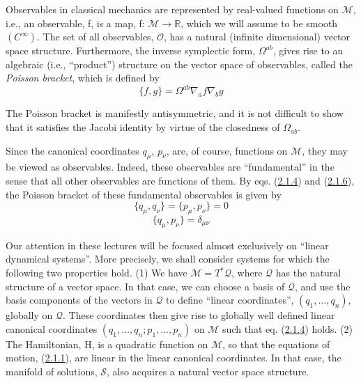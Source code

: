 \documentclass[11pt,a4paper]{article}
\begin{document}
Observables in classical mechanics are represented by real-valued functions on \(\mathcal{M}\), i.e., an observable, f, is a map, f: \(\mathcal{M} \to \mathbb{R}\), which we will assume to be smooth \((C^{\scriptscriptstyle\infty})\). The set of all observables, \(\mathcal{O}\), has a natural (infinite dimensional) vector space structure. Furthermore, the inverse symplectic form, \(\Omega^{ab}\), gives rise to an algebraic (i.e., ``product'') structure on the vector space of observables, called the \emph{Poisson bracket}, which is defined by
\begin{equation*}
\{f,g\} = \Omega^{ab} \nabla_a f \nabla_b g \tag{2.1.6}\label{eq:2.1.6}
\end{equation*}

\hypertarget{source-27}{}

The Poisson bracket is manifestly antisymmetric, and it is not difficult to show that it satisfies the Jacobi identity by virtue of the closedness of \(\Omega_{ab}\).

Since the canonical coordinates \(q_\mu\), \(p_\nu\), are, of course, functions on \(\mathcal{M}\), they may be viewed as observables. Indeed, these observables are ``fundamental'' in the sense that all other observables are functions of them. By eqs. (\hyperref[eq:2.1.4]{2.1.4}) and (\hyperref[eq:2.1.6]{2.1.6}), the Poisson bracket of these fundamental observables is given by
\begin{equation*}
\{q_{\mu}, q_{\nu}\} = \{p_{\mu}, p_{\nu}\} = 0 \tag{2.1.7}\label{eq:2.1.7}
\end{equation*}
\begin{equation*}
\{q_{\mu}, p_{\nu}\} = \delta_{\mu\nu} \tag{2.1.8}\label{eq:2.1.8}
\end{equation*}

Our attention in these lectures will be focused almost exclusively on ``linear dynamical systems''. More precisely, we shall consider systems for which the following two properties hold. (1) We have \(\mathcal{M}=T^*\mathcal{Q}\), where \(\mathcal{Q}\) has the natural structure of a vector space. In that case, we can choose a basis of \(\mathcal{Q}\), and use the basis components of the vectors in \(\mathcal{Q}\) to define ``linear coordinates'', \((q_1,\ldots,q_n)\), globally on \(\mathcal{Q}\). These coordinates then give rise to globally well defined linear canonical coordinates \((q_1,\ldots,q_n; p_1,\ldots,p_n)\) on \(\mathcal{M}\) such that eq. (\hyperref[eq:2.1.4]{2.1.4}) holds. (2) The Hamiltonian, H, is a quadratic function on \(\mathcal{M}\), so that the equations of motion, (\hyperref[eq:2.1.1]{2.1.1}), are linear in the linear canonical coordinates. In that case, the manifold of solutions, \(\mathcal{S}\), also acquires a natural vector space structure.
\end{document}
